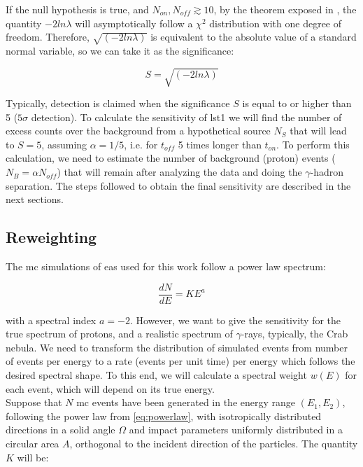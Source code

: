 \documentclass[main.tex]{subfiles}
\begin{document}
If the null hypothesis is true, and $N_{on}, N_{off} \gtrsim 10$, by the theorem exposed in \cite{1983LiMa}, the quantity $-2ln\lambda$ will asymptotically follow a $\chi^2$ distribution with one degree of freedom. Therefore, $\sqrt{(-2ln\lambda)}$ is equivalent to the absolute value of a standard normal variable, so we can take it as the significance:

\begin{equation}
  S = \sqrt{(-2ln\lambda)}
\end{equation}

Typically, detection is claimed when the significance $S$ is equal to or higher than 5 ($5\sigma$ detection). To calculate the sensitivity of \gls{lst}1 we will find the number of excess counts over the background from a hypothetical source $N_{S}$ that will lead to $S=5$, assuming $\alpha=1/5$, i.e. for $t_{off}$ 5 times longer than $t_{on}$.
To perform this calculation, we need to estimate the number of background (proton) events ($N_{B} = \alpha N_{off}$) that will remain after analyzing the data and doing the $\gamma$-hadron separation. The steps followed to obtain the final sensitivity are described in the next sections.

\subsection{Reweighting}

The \gls{mc} simulations of \gls{eas} used for this work follow a power law spectrum:

\begin{equation} \label{eq:powerlaw}
  \frac{dN}{dE} = K E^{a}
\end{equation}

with a spectral index $a=-2$. However, we want to give the sensitivity for the true spectrum of protons, and a realistic spectrum of $\gamma$-rays, typically, the Crab nebula. We need to transform the distribution of simulated events from number of events per energy to a rate (events per unit time) per energy which follows the desired spectral shape. To this end, we will calculate a spectral weight $w(E)$ for each event, which will depend on its true energy.\\
Suppose that $N$ \gls{mc} events have been generated in the energy range $(E_1, E_2)$, following the power law from \ref{eq:powerlaw}, with isotropically distributed directions in a solid angle $\Omega$ and impact parameters uniformly distributed in a circular area $A$, orthogonal to the incident direction of the particles.
The quantity $K$ will be:
\end{document}
